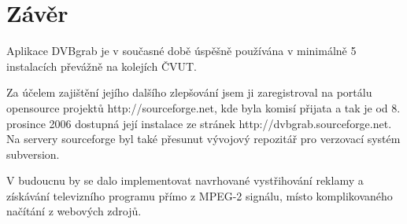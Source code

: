 \chapter{Závěr}
Aplikace DVBgrab je v současné době úspěšně používána v minimálně 5 instalacích převážně na kolejích ČVUT. 

Za účelem zajištění jejího dalšího zlepšování jsem ji zaregistroval na portálu opensource projektů http://sourceforge.net, kde byla komisí přijata a tak je od 8. prosince 2006 dostupná její instalace ze stránek http://dvbgrab.sourceforge.net. Na servery sourceforge byl také přesunut vývojový repozitář pro verzovací systém subversion.

V budoucnu by se dalo implementovat navrhované vystřihování reklamy a získávání televizního programu přímo z MPEG-2 signálu, místo komplikovaného načítání z webových zdrojů.
